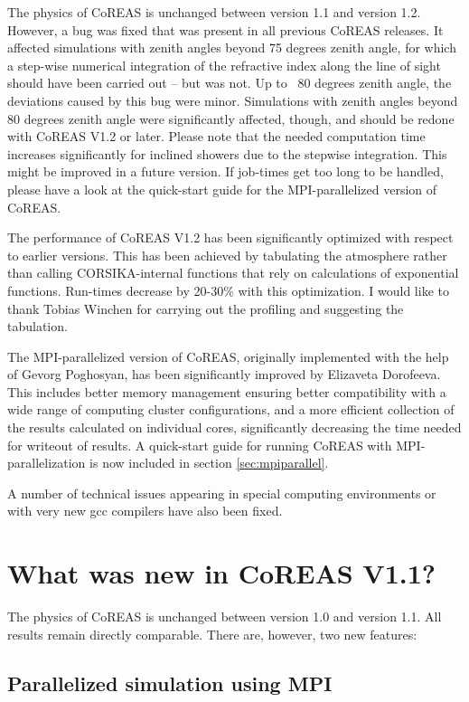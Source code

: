 \documentclass[a4paper,10pt]{article}
\begin{document}
The physics of CoREAS is unchanged between version 1.1 and version 1.2. However, a bug was fixed that was present in all previous CoREAS releases. It affected simulations with zenith angles beyond 75 degrees zenith angle, for which a step-wise numerical integration of the refractive index along the line of sight should have been carried out -- but was not. Up to ~80 degrees zenith angle, the deviations caused by this bug were minor. Simulations with zenith angles beyond 80 degrees zenith angle were significantly affected, though, and should be redone with CoREAS V1.2 or later. Please note that the needed computation time increases significantly for inclined showers due to the stepwise integration. This might be improved in a future version. If job-times get too long to be handled, please have a look at the quick-start guide for the MPI-parallelized version of CoREAS.

The performance of CoREAS V1.2 has been significantly optimized with respect to earlier versions. This has been achieved by tabulating the atmosphere rather than calling CORSIKA-internal functions that rely on calculations of exponential functions. Run-times decrease by 20-30\% with this optimization. I would like to thank Tobias Winchen for carrying out the profiling and suggesting the tabulation.

The MPI-parallelized version of CoREAS, originally implemented with the help of Gevorg Poghosyan, has been significantly improved by Elizaveta Dorofeeva. This includes better memory management ensuring better compatibility with a wide range of computing cluster configurations, and a more efficient collection of the results calculated on individual cores, significantly decreasing the time needed for writeout of results. A quick-start guide for running CoREAS with MPI-parallelization is now included in section \ref{sec:mpiparallel}.

A number of technical issues appearing in special computing environments or with very new gcc compilers have also been fixed.

\section{What was new in CoREAS V1.1?}

The physics of CoREAS is unchanged between version 1.0 and version 1.1. All results remain directly comparable. There are, however, two new features:

\subsection{Parallelized simulation using MPI}
\end{document}

